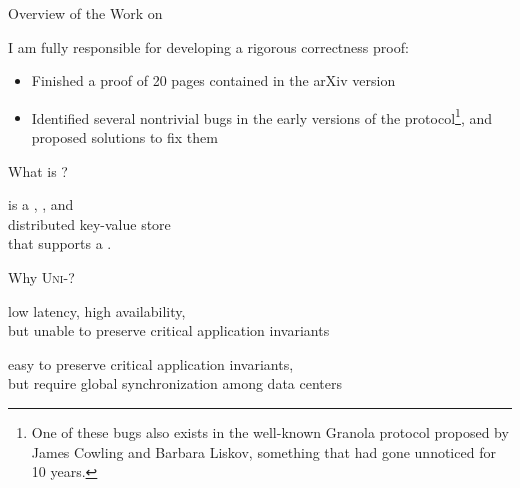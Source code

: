 \begin{frame}{Overview of the Work on \unistore}
  \begin{center}
    \vspace{0.20cm}

    \vspace{0.80cm}
    \noindent I am fully responsible for developing a rigorous correctness proof: \\[3pt]

    \pause
    \begin{itemize}[<+->]
      \item Finished a proof of 20 pages contained in the \textsf{arXiv} version
      \item Identified several nontrivial bugs in the early versions of the
            protocol\footnote{ One of these bugs also exists in the well-known Granola
              protocol proposed by James Cowling and Barbara Liskov, something that had gone
              unnoticed for 10 years.}, and proposed solutions to fix them
    \end{itemize}
  \end{center}
\end{frame}

\begin{frame}{What is \unistore?}
  \begin{center}
    \unistore{} is a , , and  \\[8pt]
     distributed key-value store \\[8pt]
    that supports a .
  \end{center}
\end{frame}

\begin{frame}{Why \textsc{Uni-}?}
  \begin{center}
     low latency, high availability, \\[3pt]
    but unable to preserve critical application invariants


     easy to preserve critical application invariants, \\[3pt]
    but require global synchronization among data centers
  \end{center}
\end{frame}


